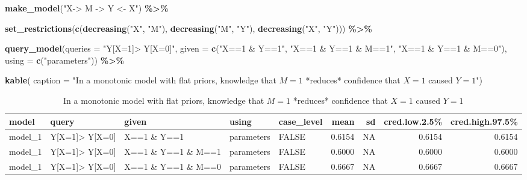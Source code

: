 \documentclass[
  12pt,
]{book}
\newenvironment{Shaded}{\begin{snugshade}}{\end{snugshade}}
\newcommand{\AttributeTok}[1]{\textcolor[rgb]{0.13,0.29,0.53}{#1}}
\newcommand{\FunctionTok}[1]{\textcolor[rgb]{0.13,0.29,0.53}{\textbf{#1}}}
\newcommand{\NormalTok}[1]{#1}
\newcommand{\SpecialCharTok}[1]{\textcolor[rgb]{0.81,0.36,0.00}{\textbf{#1}}}
\newcommand{\StringTok}[1]{\textcolor[rgb]{0.31,0.60,0.02}{#1}}
\begin{document}
\begin{Shaded}
\begin{Highlighting}[]
\FunctionTok{make\_model}\NormalTok{(}\StringTok{"X{-}\textgreater{} M {-}\textgreater{} Y \textless{}{-} X"}\NormalTok{) }\SpecialCharTok{\%\textgreater{}\%} 
  
  \FunctionTok{set\_restrictions}\NormalTok{(}\FunctionTok{c}\NormalTok{(}\FunctionTok{decreasing}\NormalTok{(}\StringTok{"X"}\NormalTok{, }\StringTok{"M"}\NormalTok{), }
                     \FunctionTok{decreasing}\NormalTok{(}\StringTok{"M"}\NormalTok{, }\StringTok{"Y"}\NormalTok{), }
                     \FunctionTok{decreasing}\NormalTok{(}\StringTok{"X"}\NormalTok{, }\StringTok{"Y"}\NormalTok{))) }\SpecialCharTok{\%\textgreater{}\%}
  
  \FunctionTok{query\_model}\NormalTok{(}\AttributeTok{queries =} \StringTok{"Y[X=1]\textgreater{} Y[X=0]"}\NormalTok{,}
              \AttributeTok{given =} \FunctionTok{c}\NormalTok{(}\StringTok{"X==1 \& Y==1"}\NormalTok{, }
                        \StringTok{"X==1 \& Y==1 \& M==1"}\NormalTok{, }
                        \StringTok{"X==1 \& Y==1 \& M==0"}\NormalTok{),}
              \AttributeTok{using =} \FunctionTok{c}\NormalTok{(}\StringTok{"parameters"}\NormalTok{)) }\SpecialCharTok{\%\textgreater{}\%}
  
  \FunctionTok{kable}\NormalTok{(}
    \AttributeTok{caption =} \StringTok{"In a monotonic model with flat priors, knowledge}
\StringTok{    that $M=1$ *reduces* confidence that $X=1$ caused $Y=1$"}\NormalTok{)}
\end{Highlighting}
\end{Shaded}

\begin{table}

\caption{\label{tab:unnamed-chunk-43}In a monotonic model with flat priors, knowledge
    that $M=1$ *reduces* confidence that $X=1$ caused $Y=1$}
\centering
\begin{tabular}[t]{l|l|l|l|l|r|r|r|r}
\hline
model & query & given & using & case\_level & mean & sd & cred.low.2.5\% & cred.high.97.5\%\\
\hline
model\_1 & Y[X=1]> Y[X=0] & X==1 \& Y==1 & parameters & FALSE & 0.6154 & NA & 0.6154 & 0.6154\\
\hline
model\_1 & Y[X=1]> Y[X=0] & X==1 \& Y==1 \& M==1 & parameters & FALSE & 0.6000 & NA & 0.6000 & 0.6000\\
\hline
model\_1 & Y[X=1]> Y[X=0] & X==1 \& Y==1 \& M==0 & parameters & FALSE & 0.6667 & NA & 0.6667 & 0.6667\\
\hline
\end{tabular}
\end{table}
\end{document}
